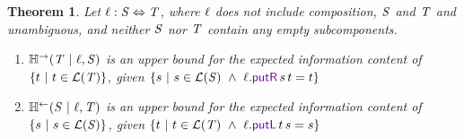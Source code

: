 \documentclass[acmsmall,screen,anonymous]{acmart}
\newtheorem*{theorem*}{Theorem}
\begin{document}
\begin{theorem*}
  Let $\mathit{\ell} : \mathit{S} \Leftrightarrow \mathit{T}$, where $\mathit{\ell}$ does not
  include composition, $\mathit{S}$ and $\mathit{T}$ and unambiguous, and neither
  $\mathit{S}$ nor $\mathit{T}$ contain any empty subcomponents.
  \begin{enumerate}
  \item $\mathbb{H}^\rightarrow(\mathit{T} ~|~ \mathit{\ell}, \mathit{S})$ is an upper bound for the expected
    information content of $\{t ~|~ t \in \mathcal{L}(\mathit{T})\}$,
    given $\SetOf{s \SuchThat s \in \LanguageOf{\Regex} \BooleanAnd
      \Lens.\PutROf{s}{t} = t}$
  \item $\mathbb{H}^\leftarrow(\mathit{S} ~|~ \mathit{\ell}, \mathit{T})$ is an upper bound for the expected
    information content of $\{s ~|~ s \in \mathcal{L}(\mathit{S})\}$,
    given $\SetOf{t \SuchThat t \in \LanguageOf{\RegexAlt} \BooleanAnd
      \Lens.\PutLOf{t}{s} = s}$
  \end{enumerate}
\end{theorem*}
\end{document}
